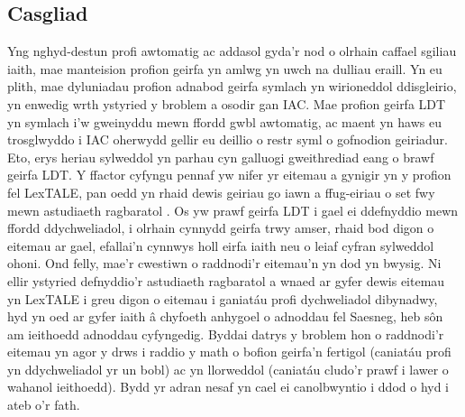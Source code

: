 \subsection{Casgliad}
Yng nghyd-destun profi awtomatig ac addasol gyda'r nod o olrhain caffael sgiliau iaith, mae manteision profion geirfa yn amlwg yn uwch na dulliau eraill. Yn eu plith, mae dyluniadau profion adnabod geirfa symlach yn wirioneddol ddisgleirio, yn enwedig wrth ystyried y broblem a osodir gan IAC\@. Mae profion geirfa LDT yn symlach i'w gweinyddu mewn ffordd gwbl awtomatig, ac maent yn haws eu trosglwyddo i IAC oherwydd gellir eu deillio o restr syml o gofnodion geiriadur. Eto, erys heriau sylweddol yn parhau cyn galluogi gweithrediad eang o brawf geirfa LDT\@. Y ffactor cyfyngu pennaf yw nifer yr eitemau a gynigir yn y profion fel LexTALE, pan oedd yn rhaid dewis geiriau go iawn a ffug-eiriau o set fwy mewn astudiaeth ragbaratol \parencite{lemhofer_introducing_2012}. Os yw prawf geirfa LDT i gael ei ddefnyddio mewn ffordd ddychweliadol, i olrhain cynnydd geirfa trwy amser, rhaid bod digon o eitemau ar gael, efallai'n cynnwys holl eirfa iaith neu o leiaf cyfran sylweddol ohoni. Ond felly, mae'r cwestiwn o raddnodi'r eitemau'n yn dod yn bwysig. Ni ellir ystyried defnyddio’r astudiaeth ragbaratol a wnaed ar gyfer dewis eitemau yn LexTALE i greu digon o eitemau i ganiatáu profi dychweliadol dibynadwy, hyd yn oed ar gyfer iaith â chyfoeth anhygoel o adnoddau fel Saesneg, heb sôn am ieithoedd adnoddau cyfyngedig. Byddai datrys y broblem hon o raddnodi'r eitemau yn agor y drws i raddio y math o bofion geirfa'n fertigol (caniatáu profi yn ddychweliadol yr un bobl) ac yn llorweddol (caniatáu cludo'r prawf i lawer o wahanol ieithoedd). Bydd yr adran nesaf yn cael ei canolbwyntio i ddod o hyd i ateb o'r fath.

